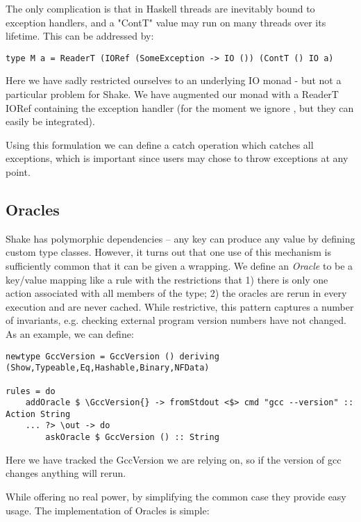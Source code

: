 The only complication is that in Haskell threads are inevitably bound to exception handlers, and a \lst"ContT" value may run on many threads over its lifetime. This can be addressed by:

\begin{lstlisting}
type M a = ReaderT (IORef (SomeException -> IO ()) (ContT () IO a)
\end{lstlisting}

Here we have sadly restricted ourselves to an underlying IO monad - but not a particular problem for Shake. We have augmented our monad with a ReaderT IORef containing the exception handler (for the moment we ignore \cite{extensible exceptions}, but they can easily be integrated).

Using this formulation we can define a catch operation which catches all exceptions, which is important since users may chose to throw exceptions at any point.

\subsection{Oracles}

Shake has polymorphic dependencies -- any key can produce any value by defining custom type classes. However, it turns out that one use of this mechanism is sufficiently common that it can be given a wrapping. We define an \textit{Oracle} to be a key/value mapping like a rule with the restrictions that 1) there is only one action associated with all members of the type; 2) the oracles are rerun in every execution and are never cached. While restrictive, this pattern captures a number of invariants, e.g. checking external program version numbers have not changed. As an example, we can define:

\begin{lstlisting}
newtype GccVersion = GccVersion () deriving (Show,Typeable,Eq,Hashable,Binary,NFData)

rules = do
    addOracle $ \GccVersion{} -> fromStdout <$> cmd "gcc --version" :: Action String
    ... ?> \out -> do
        askOracle $ GccVersion () :: String
\end{lstlisting}

Here we have tracked the GccVersion we are relying on, so if the version of gcc changes anything will rerun.

While offering no real power, by simplifying the common case they provide easy usage. The implementation of Oracles is simple:

